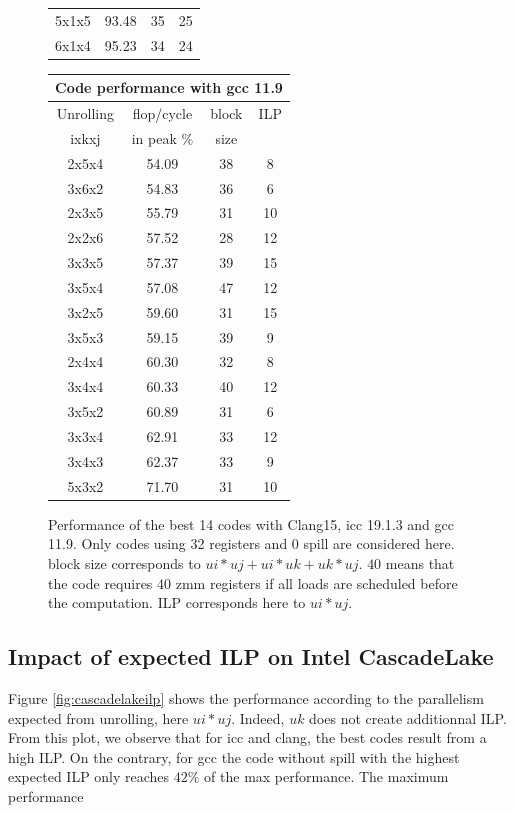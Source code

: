 \documentclass{article}
\begin{document}
\begin{figure}[h!]
{\begin{tabular}{|c|c|c|c|}
5x1x5 & 93.48 & 35 & 25 \\
6x1x4 & 95.23 & 34 & 24 \\
\hline
    \end{tabular}
    \begin{tabular}{|c|c|c|c|}
      \hline
      \multicolumn{4}{|c|}{Code performance with gcc 11.9} \\
      \hline
      Unrolling & flop/cycle & block  & ILP\\
      ixkxj& in peak \% & size & \\
      \hline
2x5x4 & 54.09 & 38 & 8 \\
3x6x2 & 54.83 & 36 & 6 \\
2x3x5 & 55.79 & 31 & 10 \\
2x2x6 & 57.52 & 28 & 12 \\
3x3x5 & 57.37 & 39 & 15 \\
3x5x4 & 57.08 & 47 & 12 \\
3x2x5 & 59.60 & 31 & 15 \\
3x5x3 & 59.15 & 39 & 9 \\
2x4x4 & 60.30 & 32 & 8 \\
3x4x4 & 60.33 & 40 & 12 \\
3x5x2 & 60.89 & 31 & 6 \\
3x3x4 & 62.91 & 33 & 12 \\
3x4x3 & 62.37 & 33 & 9 \\
5x3x2 & 71.70 & 31 & 10 \\
\hline
    \end{tabular}
}
\caption{Performance of the best 14 codes with Clang15,  icc 19.1.3 and gcc 11.9. Only codes using 32 registers and 0 spill are considered here\label{fig:tables}. block size corresponds to $ui*uj+ui*uk+uk*uj$. $40$ means that the code requires $40$ zmm registers if all loads are scheduled before the computation. ILP corresponds here to $ui*uj$.}
\end{figure}

\subsection{Impact of expected ILP on Intel CascadeLake}
Figure \ref{fig:cascadelakeilp} shows the performance according to the parallelism expected from unrolling, here $ui * uj$. Indeed, $uk$ does not create additionnal ILP. From this plot, we observe that for icc and clang, the best codes result from a high ILP. On the contrary, for gcc the code without spill with the highest expected ILP only reaches $42\%$ of the max performance. The maximum performance  
\end{document}
